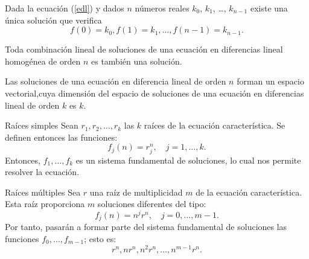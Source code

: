 \begin{frame}

\begin{theorem}
	Dada la ecuación (\ref{edl}) y dados $n$ números reales $k_{0}$, $k_{1}$, \ldots, $k_{n-1}$ existe una única solución que verifica \[ f\left(0\right)=k_{0},f\left(1\right)=k_{1},\ldots,f\left(n-1\right)=k_{n-1}. \]
\end{theorem}

\begin{theorem}
	Toda combinación lineal de soluciones de una ecuación en diferencias lineal homogénea de orden $n$ es también una solución.
\end{theorem}

\begin{theorem}
	Las soluciones de una ecuación en diferencia lineal de orden $n$ forman un espacio vectorial,cuya dimensión del espacio de soluciones de una ecuación en diferencias lineal de orden $k$ es $k$.
\end{theorem}
\end{frame}

\begin{frame}
\begin{block}{Raíces simples}
	Sean $r_{1}, r_{2},\ldots, r_{k}$ las $k$ raíces de la ecuación característica. Se definen entonces las funciones: \[ f_{j}(n)=r^{n}_{j},\quad j=1,\ldots,k. \] Entonces, $f_{1},\ldots,f_{k}$ es un sistema fundamental de soluciones, lo cual nos permite resolver la ecuación. %
\end{block}

\begin{block}{Raíces múltiples}
	Sea $r$ una raíz de multiplicidad $m$ de la ecuación característica. Esta raíz proporciona $m$ soluciones diferentes del tipo: \[ f_{j}(n)=n^{j}r^{n},\quad j= 0,\ldots,m-1. \] Por tanto, pasarán a formar parte del sistema fundamental de soluciones las funciones $f_{0},\ldots,f_{m-1}$; esto es: \[ r^{n},nr^{n},n^{2}r^{n},\ldots,n^{m-1}r^{n}. \]
\end{block}
\end{frame}


